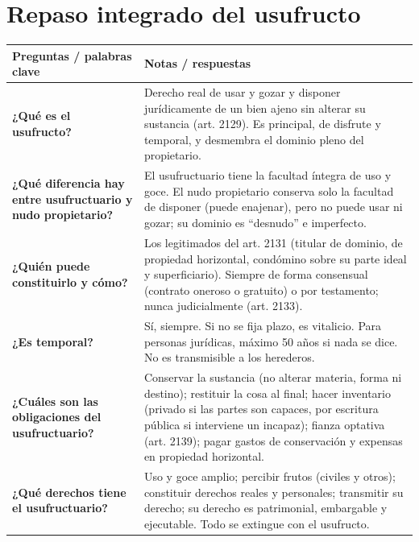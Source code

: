 \documentclass[12pt,oneside]{book}
\begin{document}
\chapter{Repaso integrado del usufructo}

\begin{longtable}{
    >{\raggedright\arraybackslash}p{}
    >{\raggedright\arraybackslash}p{}
}
\toprule
\textbf{Preguntas / palabras clave} &
\textbf{Notas / respuestas} \\
\midrule
\endhead

\textbf{¿Qué es el usufructo?} &
Derecho real de usar y gozar y disponer jurídicamente de un bien ajeno sin alterar su sustancia (art. 2129). Es principal, de disfrute y temporal, y desmembra el dominio pleno del propietario. \\

\textbf{¿Qué diferencia hay entre usufructuario y nudo propietario?} &
El usufructuario tiene la facultad íntegra de uso y goce. El nudo propietario conserva solo la facultad de disponer (puede enajenar), pero no puede usar ni gozar; su dominio es ``desnudo'' e imperfecto. \\

\textbf{¿Quién puede constituirlo y cómo?} &
Los legitimados del art. 2131 (titular de dominio, de propiedad horizontal, condómino sobre su parte ideal y superficiario). Siempre de forma consensual (contrato oneroso o gratuito) o por testamento; nunca judicialmente (art. 2133). \\

\textbf{¿Es temporal?} &
Sí, siempre. Si no se fija plazo, es vitalicio. Para personas jurídicas, máximo 50 años si nada se dice. No es transmisible a los herederos. \\

\textbf{¿Cuáles son las obligaciones del usufructuario?} &
Conservar la sustancia (no alterar materia, forma ni destino); restituir la cosa al final; hacer inventario (privado si las partes son capaces, por escritura pública si interviene un incapaz); fianza optativa (art. 2139); pagar gastos de conservación y expensas en propiedad horizontal. \\

\textbf{¿Qué derechos tiene el usufructuario?} &
Uso y goce amplio; percibir frutos (civiles y otros); constituir derechos reales y personales; transmitir su derecho; su derecho es patrimonial, embargable y ejecutable. Todo se extingue con el usufructo. \\


\end{longtable}
\end{document}
